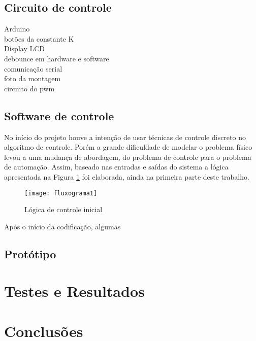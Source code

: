 \documentclass[a4paper,11pt]{article}
\begin{document}
%
\subsection{Circuito de controle}
\label{sec:arduino}
Arduino\\
botões da constante K \\
Display LCD \\
debounce em hardware e software \\
comunicação serial \\
foto da montagem \\
circuito do pwm \\

%
\subsection{Software de controle}
\label{sec:software}
No início do projeto houve a intenção de usar técnicas de controle discreto no algoritmo de controle.
Porém a grande dificuldade de modelar o problema físico levou a uma mudança de
abordagem, do problema de controle para o problema de automação. Assim, baseado
nas entradas e saídas do sistema a lógica apresentada na Figura
\ref{fig:fluxograma1} foi elaborada, ainda na primeira parte deste trabalho.
\begin{figure}[ht]
 \begin{center}
  \texttt{[image: fluxograma1]}
 \end{center}
 \caption{Lógica de controle inicial}
 \label{fig:fluxograma1}
\end{figure}
Após o início da codificação, algumas 

 
%
\subsection{Protótipo}
\label{sec:prototipo}


\pagebreak
%
\section{Testes e Resultados}
\label{sec:resultados}

\pagebreak
%
\section{Conclusões}
\label{sec:conclusoes}
\end{document}
